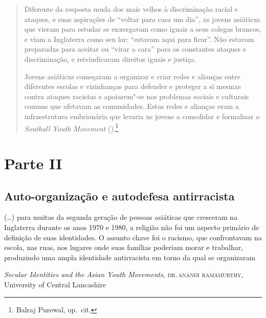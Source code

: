 \begin{quote}
Diferente da resposta muda dos mais velhos à discriminação racial e ataques, e suas aspirações de ``voltar para casa um dia'', xs jovens asiáticxs que vieram para estudar se enxergavam como iguais a seus colegas brancos, e viam a Inglaterra como seu lar: ``estavam aqui para ficar''. Não estavam preparadxs para aceitar ou ``virar a cara'' para os constantes ataques e discriminação, e reivindicaram direitos iguais e justiça.

Jovens asiáticxs começaram a organizar e criar redes e alianças entre diferentes escolas e vizinhanças para defender e proteger a si mesmxs contra ataques racistas e apoiarem"-se nos problemas sociais e culturais comuns que afetavam as comunidades. Estas redes e alianças eram a infraestrutura embrionária que levaria xs jovens a consolidar e formalizar o \emph{Southall Youth Movement} ().\footnote{Balraj Purewal, op.~cit.}
\end{quote}



\section{Parte II}

\subsection{Auto-organização e autodefesa antirracista}

\epigraph{(\ldots{}) para muitas da segunda geração de pessoas asiáticas que cresceram na Inglaterra durante os anos 1970 e 1980, a religião não foi um aspecto primário de definição de suas identidades. O assunto chave foi o racismo, que confrontavam na escola, nas ruas, nos lugares onde suas famílias poderiam morar e trabalhar, produzindo uma ampla identidade antirracista em torno da qual se organizaram}{\textit{Secular Identities and the Asian Youth Movements}, \textsc{dr.\,anandi ramamurthy}, University of Central Lancashire}

